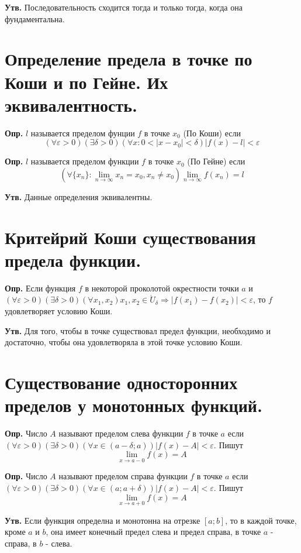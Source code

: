 \documentclass[a4paper,12pt]{article}
\begin{document}
\begin{flushleft}
	\textbf{Утв.} Последовательность сходится тогда и только тогда, когда она фундаментальна.
	
\section{Определение предела в точке по Коши и по Гейне. Их эквивалентность.}

	\textbf{Опр.} $l$ называется пределом фунции $f$ в точке $x_0$ (По Коши) если $$(\forall \varepsilon > 0) (\exists \delta > 0) (\forall x: 0 < |x - x_0| < \delta) |f(x) - l| < \varepsilon$$
	
	\textbf{Опр.} $l$ называется пределом функции $f$ в точке $x_0$ (По Гейне) если$$(\forall \{x_n\}: \lim_{n \to \infty} x_n = x_0, x_n \neq x_0) \lim_{n \to \infty} f(x_n) = l$$
	
	\textbf{Утв.} Данные определения эквивалентны.
\section{Критейрий Коши существования предела функции.}

	\textbf{Опр.} Если функция $f$ в некоторой проколотой окрестности точки $a$ и $(\forall \varepsilon > 0) (\exists \delta > 0) (\forall x_1, x_2) x_1, x_2 \in \mathring{U}_{\delta} \Rightarrow |f(x_1) - f(x_2)| < \varepsilon$, то $f$ удовлетворяет условию Коши.
    
    \textbf{Утв.} Для того, чтобы в точке существовал предел функции, необходимо и достаточно, чтобы она удовлетворяла в этой точке условию Коши.
	
\section{Существование односторонних пределов у монотонных функций.}

	\textbf{Опр.} Число $A$ называют пределом слева функции $f$ в точке $a$ если $(\forall \varepsilon > 0) (\exists \delta > 0) (\forall x \in (a - \delta; a)) |f(x) - A| < \varepsilon$. Пишут $$\lim_{x \to a - 0} f(x) = A$$
	
    \textbf{Опр.} Число $A$ называют пределом справа функции $f$ в точке $a$ если $(\forall \varepsilon > 0) (\exists \delta > 0) (\forall x \in (a; a + \delta)) |f(x) - A| < \varepsilon$. Пишут $$\lim_{x \to a + 0} f(x) = A$$

    \textbf{Утв.} Если функция определна и монотонна на отрезке $[a; b]$, то в каждой точке, кроме $a$ и $b$, она имеет конечный предел слева и предел справа, в точке $a$ - справа, в $b$ - слева.


\end{flushleft}
\end{document}
